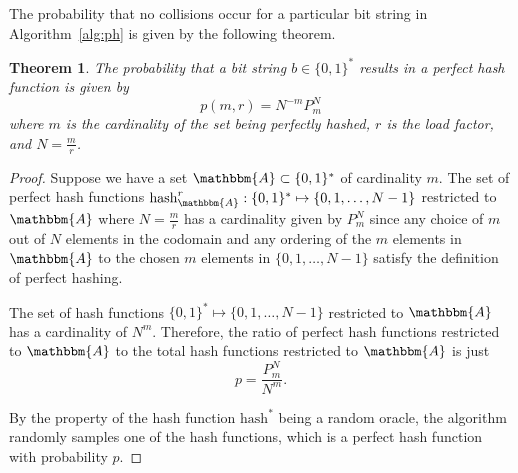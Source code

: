 \documentclass[hidelinks,11pt,final]{article}
\newcommand{\envnumstyle}{section}
\theoremstyle{plain}
\newtheorem{theorem}{Theorem}[\envnumstyle]
\begin{document}
The probability that no collisions occur for a particular bit string in Algorithm~\ref{alg:ph} is given by the following theorem.
\begin{theorem}
The probability that a bit string $b \in \{0,1\}^{*}$ results in a perfect hash function is given by
\begin{equation}
\label{eq:p_m_N}
	p(m,r) = N^{-m} P^{N}_{m}
\end{equation}
where $m$ is the cardinality of the set being perfectly hashed, $r$ is the load factor, and $N = \frac{m}{r}$.
\end{theorem}
\begin{proof}
Suppose we have a set $\mathbbm{A} \subset \{0,1\}^*$ of cardinality $m$.
The set of perfect hash functions $\mathrm{hash}_{\mathbbm{A}}^{r} : \{0,1\}^* \mapsto \{0,1,\ldots,N-1\}$ restricted to $\mathbbm{A}$ where $N = \frac{m}{r}$ has a cardinality given by $P^{N}_{m}$ since any choice of $m$ out of $N$ elements in the codomain and any ordering of the $m$ elements in $\mathbbm{A}$ to the chosen $m$ elements in $\{0,1,\ldots,N-1\}$ satisfy the definition of perfect hashing.


The set of hash functions $\{0,1\}^* \mapsto \{0,1,\ldots,N-1\}$ restricted to $\mathbbm{A}$ has a cardinality of $N^m$.
Therefore, the ratio of perfect hash functions restricted to $\mathbbm{A}$ to the total hash functions restricted to $\mathbbm{A}$ is just
\begin{equation}
	p = \frac{P^{N}_{m}}{N^m}.
\end{equation}

By the property of the hash function $\mathrm{hash}^*$ being a random oracle, the algorithm randomly samples one of the hash functions, which is a perfect hash function with probability $p$.

	

\end{proof}
\end{document}

